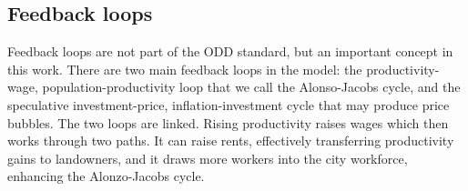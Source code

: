 
\subsection{Feedback loops}
Feedback loops are not part of the ODD standard, but an important concept in this work. 
There are two main \glspl{feedback loop} in the model: the productivity-wage, population-productivity loop that we call the Alonso-Jacobs cycle, and the speculative investment-price, inflation-investment cycle that may produce price bubbles. 
The two loops are linked. Rising productivity raises wages which then works through two paths. It can raise rents, effectively transferring productivity gains to landowners, and it draws more workers into the city workforce, enhancing the \Gls{Alonzo-Jacobs cycle}.

